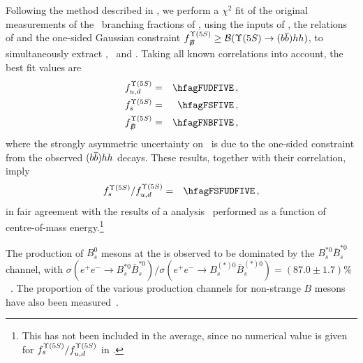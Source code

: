 Following the method described in , 
we perform a $\chi^2$ fit of the original 
measurements of the \Upsfive\ branching fractions of
,
using the inputs of ,
the relations of  and the
one-sided Gaussian constraint $\fnBfive \ge {\cal B}(\Upsfive \to (\b\bar{\b}) hh)$,
to simultaneously extract \fudfive, \fsfive\ and \fnBfive. Taking all known 
correlations into account, the best fit values are
\begin{eqnarray}
\fudfive &=& \hfagFUDFIVE \,, \labe{fudfive} \\
\fsfive  &=& \hfagFSFIVE  \,, \labe{fsfive}  \\
\fnBfive &=& \hfagFNBFIVE \,, \labe{fnBfive}
\end{eqnarray}
where the strongly asymmetric uncertainty on \fnBfive\ is due to the one-sided constraint
from the observed $(\b\bar{\b}) hh$ decays. These results, together with their correlation, 
imply
\begin{eqnarray}
\fsfive/\fudfive  &=& \hfagFSFUDFIVE  \,, \labe{fsfudfive} 
\end{eqnarray}
in fair agreement with the results of a \babar
analysis~\cite{Lees:2011ji} performed as a function 
of centre-of-mass energy.\footnote{
  \label{foot:life_mix:Lees:2011ji}
  This has not been included in the average, since 
  no numerical value is given for $f^{\Upsilon(5S)}_{s}/f^{\Upsilon(5S)}_{u,d}$ in 
  .
}

The production of $B^0_s$ mesons at the \Upsfive
is observed to be dominated by the $B_s^{*0}\bar{B}_s^{*0}$
channel, %
with $\sigma(e^+e^- \to B_s^{*0}\bar{B}_s^{*0})/%
\sigma(e^+e^- \to B_s^{(*)0}\bar{B}_s^{(*)0})
= (87.0\pm 1.7)\%$~\cite{Li:2011pg,Louvot:2008sc}.
The proportion of the various production channels 
for non-strange $B$ mesons have also been measured~\cite{Drutskoy:2010an}.

